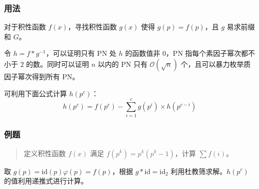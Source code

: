 \documentclass[10pt]{ctexart}
\begin{document}
\begin{multicols}{3}
    \subsubsection{用法}\label{ux7528ux6cd5-11}

    对于积性函数 \(f(x)\)，寻找积性函数 \(g(x)\) 使得
    \(g(p) = f(p)\)，且 \(g\) 易求前缀和 \(G\)。

    令 \(h = f * g^{-1}\)，可以证明只有 PN 处 \(h\) 的函数值非 \(0\)，PN
    指每个素因子幂次都不小于 \(2\) 的数。同时可以证明 \(n\) 以内的 PN
    只有 \(\mathcal O(\sqrt n)\) 个，且可以暴力枚举质因子幂次得到所有
    PN。

    可利用下面公式计算 \(h(p^c)\)：\[
    h(p^c) = f(p^c) - \sum_{i = 1}^c g(p^i) \times h(p^{c - i})
    \]

    \subsubsection{例题}\label{ux4f8bux9898-4}

    \begin{quote}
    定义积性函数 \(f(x)\) 满足 \(f(p^k) = p^k(p^k - 1)\)，计算
    \(\sum f(i)\)。
    \end{quote}

    取 \(g(p) = \mathrm{id}(p)\varphi(p) = f(p)\)，根据
    \(g * \mathrm{id} = \mathrm{id}_2\) 利用杜教筛求解。\(h(p^c)\)
    的值利用递推式进行计算。


\end{multicols}
\end{document}
